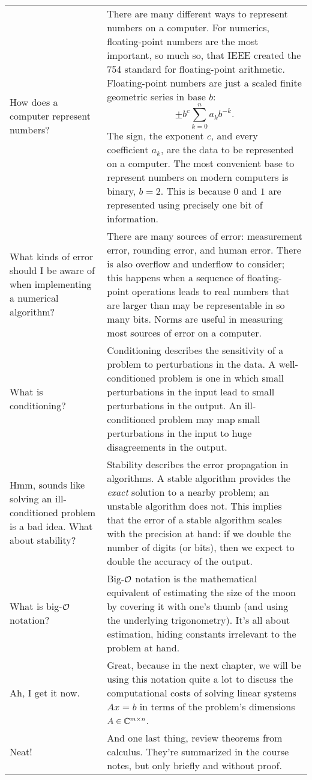 \documentclass[11pt,letterpaper]{article}
\begin{document}
\begin{longtable}{p{}|p{}}
How does a computer represent numbers? & There are many different ways to represent numbers on a computer. For numerics, floating-point numbers are the most important, so much so, that IEEE created the 754 standard for floating-point arithmetic. Floating-point numbers are just a scaled finite geometric series in base $b$:
\[
\pm b^c\sum_{k=0}^n a_k b^{-k}.
\]
The sign, the exponent $c$, and every coefficient $a_k$, are the data to be represented on a computer. The most convenient base to represent numbers on modern computers is binary, $b=2$. This is because $0$ and $1$ are represented using precisely one bit of information.\\
What kinds of error should I be aware of when implementing a numerical algorithm? & There are many sources of error: measurement error, rounding error, and human error. There is also overflow and underflow to consider; this happens when a sequence of floating-point operations leads to real numbers that are larger than may be representable in so many bits. Norms are useful in measuring most sources of error on a computer.\\
What is conditioning? & Conditioning describes the sensitivity of a problem to perturbations in the data. A well-conditioned problem is one in which small perturbations in the input lead to small perturbations in the output. An ill-conditioned problem may map small perturbations in the input to huge disagreements in the output.\\
Hmm, sounds like solving an ill-conditioned problem is a bad idea. What about stability? & Stability describes the error propagation in algorithms. A stable algorithm provides the {\em exact} solution to a nearby problem; an unstable algorithm does not. This implies that the error of a stable algorithm scales with the precision at hand: if we double the number of digits (or bits), then we expect to double the accuracy of the output.\\
What is big-$\mathcal{O}$ notation? & Big-$\mathcal{O}$ notation is the mathematical equivalent of estimating the size of the moon by covering it with one's thumb (and using the underlying trigonometry). It's all about estimation, hiding constants irrelevant to the problem at hand.\\
Ah, I get it now. & Great, because in the next chapter, we will be using this notation quite a lot to discuss the computational costs of solving linear systems $Ax = b$ in terms of the problem's dimensions $A\in\mathbb{C}^{m\times n}$.\\
Neat! & And one last thing, review theorems from calculus. They're summarized in the course notes, but only briefly and without proof.\\
\hline
\end{longtable}
\end{document}
